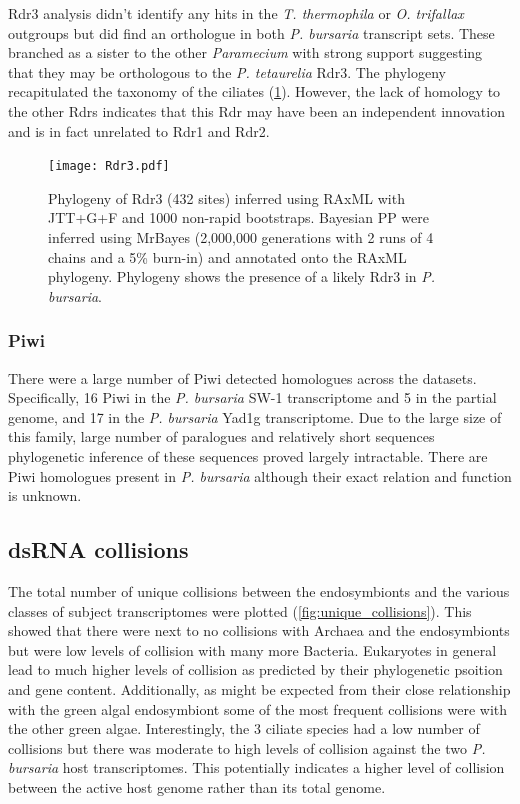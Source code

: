 Rdr3 analysis didn't identify any hits in the \textit{T. thermophila}
or \textit{O. trifallax} outgroups but did find an orthologue
in both \textit{P. bursaria} transcript sets.  These branched
as a sister to the other \textit{Paramecium} with strong support
suggesting that they may be orthologous to the \textit{P. tetaurelia}
Rdr3. The phylogeny recapitulated the taxonomy of the ciliates (\cref{fig:rdr3_phylo}).
However, the lack of homology to the other Rdrs indicates that
this Rdr may have been an independent innovation and is in fact
unrelated to Rdr1 and Rdr2.


\begin{figure}
    \texttt{[image: Rdr3.pdf]}
    \caption[Rdr3 Phylogeny]{Phylogeny of Rdr3 (432 sites)
        inferred using RAxML with JTT+G+F and 1000 non-rapid
        bootstraps. Bayesian PP were inferred using MrBayes
        (2,000,000 generations with 2 runs of 4 chains and a 5\% burn-in)
        and annotated onto the RAxML phylogeny.  Phylogeny
        shows the presence of a likely Rdr3 in \textit{P. bursaria}.}
    \label{fig:rdr3_phylo}
\end{figure}

\subsubsection{Piwi}

There were a large number of Piwi detected homologues across
the datasets. Specifically, 16 Piwi in the \textit{P. bursaria} SW-1
transcriptome and 5 in the partial genome, and 17 in the \textit{P. 
bursaria} Yad1g transcriptome.
Due to the large size of this family, large number of paralogues
and relatively short sequences phylogenetic inference
of these sequences proved largely intractable. There are Piwi
homologues present in \textit{P. bursaria} although their exact
relation and function is unknown.


\subsection{dsRNA collisions}

The total number of unique collisions between the endosymbionts and 
the various classes of subject transcriptomes were plotted
(\cref{fig:unique_collisions}).  This showed that there 
were next to no collisions with Archaea and the endosymbionts but were
low levels of collision with many more Bacteria.  Eukaryotes in general
lead to much higher levels of collision as predicted by their
phylogenetic psoition and gene content.
Additionally, as might be expected from their close relationship with the green algal endosymbiont
some of the most frequent collisions were with the other green algae.
Interestingly,
the 3 ciliate species had a low number of collisions but there
was moderate to high levels of collision against the two
\textit{P. bursaria} host transcriptomes.  This potentially
indicates a higher level of collision between the active host genome 
rather than its total genome.

